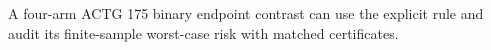 A four-arm ACTG 175 binary endpoint contrast can use the explicit rule and audit its finite-sample worst-case risk with matched certificates.